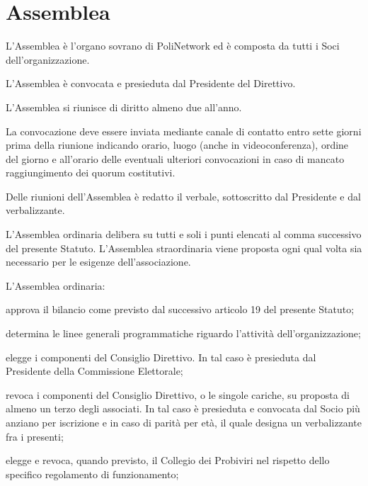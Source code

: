 \documentclass[legalpaper, 11pt]{exam}
\let\tempone\enumerate
\let\temptwo\endenumerate
\renewenvironment{enumerate}{\tempone\addtolength{\itemsep}{-0.45\baselineskip}}{\temptwo}
\begin{document}
{\section{Assemblea}
\begin{enumerate}
 \item L’Assemblea è l’organo sovrano di PoliNetwork ed è composta da tutti i Soci dell’organizzazione.
 \item L’Assemblea è convocata e presieduta dal Presidente del Direttivo.
 \item L’Assemblea si riunisce di diritto almeno due all’anno.
 \item La convocazione deve essere inviata mediante canale di contatto entro sette giorni prima della riunione indicando orario, luogo (anche in videoconferenza), ordine del giorno e all’orario delle eventuali ulteriori convocazioni in caso di mancato raggiungimento dei quorum costitutivi.
 \item Delle riunioni dell’Assemblea è redatto il verbale, sottoscritto dal Presidente e dal verbalizzante.
 \item L’Assemblea ordinaria delibera su tutti e soli i punti elencati al comma successivo del presente Statuto. L’Assemblea straordinaria viene proposta ogni qual volta sia necessario per le esigenze dell’associazione.
 \item L'Assemblea ordinaria:
 \vspace{-5pt}
 \begin{enumerate}
  \item approva il bilancio come previsto dal successivo articolo 19 del presente Statuto;
  \item determina le linee generali programmatiche riguardo l’attività dell’organizzazione;
  \item elegge i componenti del Consiglio Direttivo. In tal caso è presieduta dal Presidente della Commissione Elettorale;
  \item revoca i componenti del Consiglio Direttivo, o le singole cariche, su proposta di almeno un terzo degli associati. In tal caso è presieduta e convocata dal Socio più anziano per iscrizione e in caso di parità per età, il quale designa un verbalizzante fra i presenti;
  \item elegge e revoca, quando previsto, il Collegio dei Probiviri nel rispetto dello specifico regolamento di funzionamento;

\end{enumerate}
\end{enumerate}}
\end{document}
